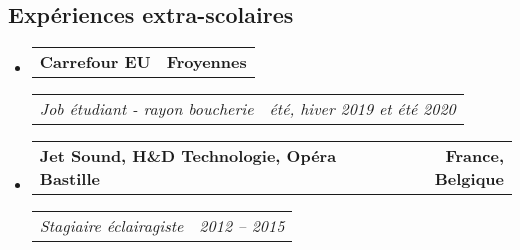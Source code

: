 \documentclass[10pt,letterpaper]{article}
\makeatletter
\newcommand{\headerrow}[2]
{\begin{tabular*}{\linewidth}{l@{\extracolsep{\fill}}r}
  #1 &
  #2 \\
\end{tabular*}}
\makeatother
\begin{document}
\subsection*{Expériences extra-scolaires}
\begin{itemize}
  \parskip=0.1em

  \item
  \headerrow
    {\textbf{Carrefour EU}}
    {\textbf{Froyennes}}
  \headerrow
    {\emph{Job étudiant - rayon boucherie}}
    {\emph{été, hiver 2019 et été 2020}}
  \item
  \headerrow
    {\textbf{Jet Sound, H\&D Technologie, Opéra Bastille}}
    {\textbf{France, Belgique}}
  \headerrow
    {\emph{Stagiaire éclairagiste}}
    {\emph{2012 -- 2015}}
\end{itemize}


\vspace{-0.4em}
\end{document}
